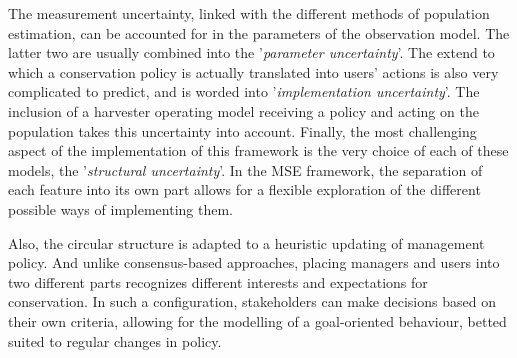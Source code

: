 \documentclass[12pt,a4paper]{article}
\begin{document}
The measurement uncertainty, linked with the different methods of population estimation, can be accounted for in the parameters of the observation model.
The latter two are usually combined into the '\textit{parameter uncertainty}'.
The extend to which a conservation policy is actually translated into users' actions is also very complicated to predict, and is worded into '\textit{implementation uncertainty}'.
The inclusion of a harvester operating model receiving a policy and acting on the population takes this uncertainty into account.
Finally, the most challenging aspect of the implementation of this framework is the very choice of each of these models, the '\textit{structural uncertainty}'.
In the MSE framework, the separation of each feature into its own part allows for a flexible exploration of the different possible ways of implementing them.

Also, the circular structure is adapted to a heuristic updating of management policy.
And unlike consensus-based approaches, placing managers and users into two different parts recognizes different interests and expectations for conservation.
In such a configuration, stakeholders can make decisions based on their own criteria, allowing for the modelling of a goal-oriented behaviour, betted suited to regular changes in policy.
\end{document}
